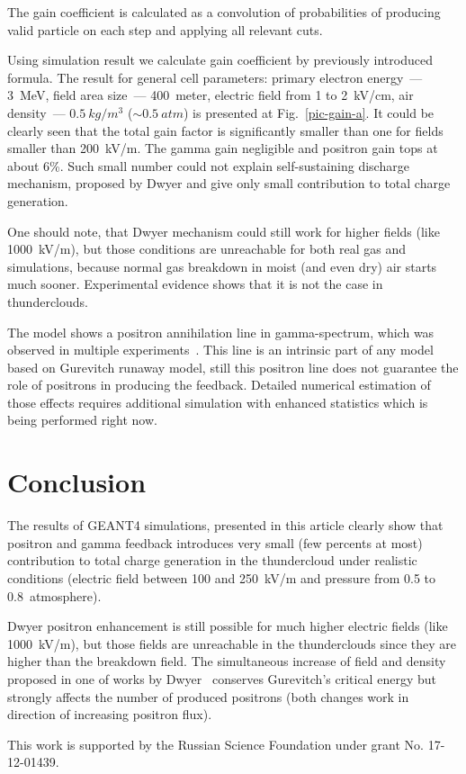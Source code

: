 \documentclass[utf8]{webofc}
\begin{document}
    The gain coefficient is calculated as a convolution of probabilities of producing valid particle on each step and applying all relevant cuts.
    
    Using simulation result we calculate gain coefficient by previously introduced formula. The result for general cell parameters: primary electron energy~--- 3~MeV, field area size~--- 400~meter, electric field from 1 to 2~kV/cm, air density~--- $0.5~kg/m^3$ ($\sim 0.5~atm$) is presented at Fig.~\ref{pic-gain-a}. It could be clearly seen that the total gain factor is significantly smaller than one for fields smaller than 200~kV/m. The gamma gain negligible and positron gain tops at about 6\%. Such small number could not explain self-sustaining discharge mechanism, proposed by Dwyer and give only small contribution to total charge generation.
    
    One should note, that Dwyer mechanism could still work for higher fields (like 1000~kV/m), but those conditions are unreachable for both real gas and simulations, because normal gas breakdown in moist (and even dry) air starts much sooner. Experimental evidence shows that it is not the case in thunderclouds.
    
    The model shows a positron annihilation line in gamma-spectrum, which was observed in multiple experiments~\cite{dwyer2015positron}. This line is an intrinsic part of any model based on Gurevitch runaway model, still this positron line does not guarantee the role of positrons in producing the feedback. Detailed numerical estimation of those effects requires additional simulation with enhanced statistics which is being performed right now.
    
    \section{Conclusion}
    
    The results of GEANT4 simulations, presented in this article clearly show that positron and gamma feedback introduces very small (few percents at most) contribution to total charge generation in the thundercloud under realistic conditions (electric field between 100 and 250~kV/m and pressure from 0.5 to 0.8~atmosphere). 
    
    Dwyer positron enhancement is still possible for much higher electric fields (like 1000~kV/m), but those fields are unreachable in the thunderclouds since they are higher than the breakdown field. The simultaneous increase of field and density proposed in one of works by Dwyer~\cite{dwyer2003fundamental} conserves Gurevitch's critical energy but strongly affects the number of produced positrons (both changes work in direction of increasing positron flux).
    
    This work is supported by the Russian Science Foundation under grant No. 17-12-01439.
    
    {}
\end{document}
